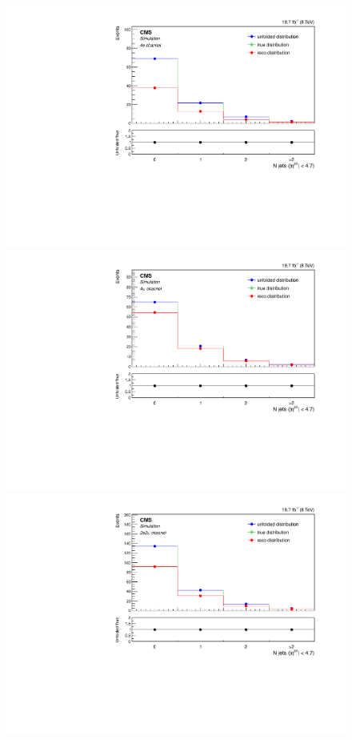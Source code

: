 \begin{figure}[hbtp]
  \begin{center}
    \includegraphics[width=0.8\cmsFigWidth]{Figures/Unfolding/MCTests/Jets_ZZTo4e_MadMatrix_MadDistr_FullSample_fr}     
    \includegraphics[width=0.8\cmsFigWidth]{Figures/Unfolding/MCTests/Jets_ZZTo4m_MadMatrix_MadDistr_FullSample_fr}     
    \includegraphics[width=0.8\cmsFigWidth]{Figures/Unfolding/MCTests/Jets_ZZTo2e2m_MadMatrix_MadDistr_FullSample_fr}

\end{center}
\end{figure}
